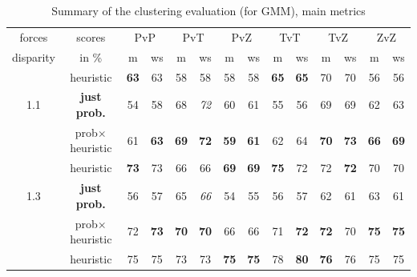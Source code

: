 \setlength{\tabcolsep}{5pt}
\begin{table}[ht]
\caption{Summary of the clustering evaluation (for GMM), main metrics}
\begin{center}
\begin{footnotesize}
\begin{tabular}{|c|c|cc|cc|cc|cc|cc|cc|}%
\hline
forces & scores & \multicolumn{2}{|c|}{PvP} & \multicolumn{2}{|c|}{PvT} & \multicolumn{2}{|c|}{PvZ} & \multicolumn{2}{|c|}{TvT} & \multicolumn{2}{|c|}{TvZ} & \multicolumn{2}{|c|}{ZvZ} \\%
disparity & in \% & m & ws & m & ws & m & ws & m & ws & m & ws& m & ws \\
\hline

& heuristic & \textbf{63} & 63 & 58 & 58 & 58 & 58 & \textbf{65} & \textbf{65} & 70 & 70 & 56 & 56 \\
1.1     & \textbf{just prob.} & 54 & 58 & 68 & \textit{72} & 60 & 61 & 55 & 56 & 69 & 69 & 62 & 63 \\ 
    & prob$\times$heuristic & 61 & \textbf{63} & \textbf{69} & \textbf{72} & \textbf{59} & \textbf{61} & 62 & 64 & \textbf{70} & \textbf{73} & \textbf{66} & \textbf{69} \\
\hline
& heuristic & \textbf{73} & 73 & 66 & 66 & \textbf{69} & \textbf{69} & \textbf{75} & 72 & 72 & \textbf{72} & 70 & 70 \\
1.3     & \textbf{just prob.} & 56 & 57 & 65 & \textit{66} & 54 & 55 & 56 & 57 & 62 & 61 & 63 & 61 \\
    & prob$\times$heuristic & 72 & \textbf{73} & \textbf{70} & \textbf{70} & 66 & 66 & 71 & \textbf{72} & \textbf{72} & 70 & \textbf{75} & \textbf{75} \\
\hline
& heuristic & 75 & 75 & 73 & 73 & \textbf{75} & \textbf{75} & 78 & \textbf{80} & \textbf{76} & 76 & 75 & 75 \\

\end{tabular}
\end{footnotesize}
\end{center}
\end{table}
